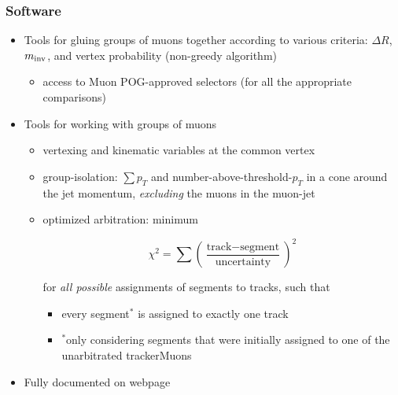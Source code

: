 \documentclass[compress]{beamer}
\begin{document}
\begin{frame}
\frametitle{Software}
\begin{itemize}
\item Tools for gluing groups of muons together according to various
  criteria: $\Delta R$, $m_{\mbox{\scriptsize inv}}$, and vertex
  probability (non-greedy algorithm)
\begin{itemize}
\item access to Muon POG-approved selectors (for all the appropriate comparisons)
\end{itemize}

\item Tools for working with groups of muons
\begin{itemize}
\item vertexing and kinematic variables at the common vertex
\item group-isolation: $\sum p_T$ and number-above-threshold-$p_T$ in
  a cone around the jet momentum, {\it excluding} the muons in the
  muon-jet
\item optimized arbitration: minimum

\[ \chi^2 = \sum \left(\frac{\mbox{track} - \mbox{segment}}{\mbox{uncertainty}}\right)^2 \]

for {\it all possible} assignments of segments to tracks, such that
\begin{itemize}
\item every segment$^*$ is assigned to exactly one track
\item $^*$only considering segments that were initially assigned to one of the unarbitrated trackerMuons
\end{itemize}
\end{itemize}

\item Fully documented on webpage
\end{itemize}
\end{frame}
\end{document}
